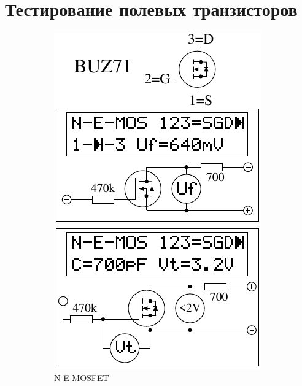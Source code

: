 \chapter{Тестирование полевых транзисторов}
\label{sec:MOSmeasurements}

\begin{figure}[H]
  \begin{subfigure}[b]{.5\textwidth}
    \centering
    \includegraphics[width=1.\textwidth]{../FIG/MOS_BUZ71.pdf}
    \caption{N-E-MOSFET}
    \label{fig:MOS-N-E}
  \end{subfigure}
  ~
  \begin{subfigure}[b]{.5\textwidth}

\end{subfigure}
\end{figure}
